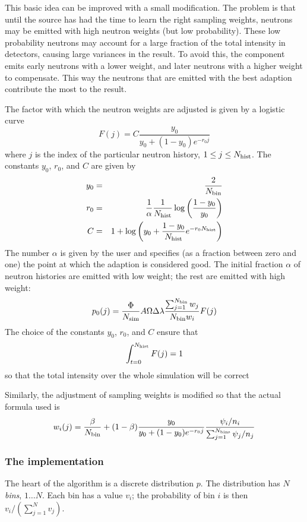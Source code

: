 This basic idea can be improved with a small modification. The problem
is that until the source has had the time to learn the right sampling
weights, neutrons may be emitted with high neutron weights (but low
probability). These low probability neutrons may account for a large fraction of
the total intensity in detectors, causing large variances in the
result. To avoid this, the component emits early neutrons with a lower
weight, and later neutrons with a higher weight to compensate. This way
the neutrons that are emitted with the best adaption contribute the most
to the result.

The factor with which the neutron weights are adjusted is given by a
logistic curve
\begin{equation}
  F(j) = C\frac{y_0}{y_0 + (1 - y_0) e^{-r_0 j}}
\end{equation}
where $j$ is the index of the particular neutron history, $1 \leq j
\leq N_{\rm hist}$. The constants $y_0$, $r_0$, and $C$ are given by
\begin{eqnarray}
  y_0 &=& \frac{2}{N_{\rm bin}} \\
  r_0 &=& \frac{1}{\alpha}\frac{1}{N_{\rm hist}}
     \log\left(\frac{1 - y_0}{y_0}\right) \\
  C &=& 1 + \log\left(y_0 + \frac{1 - y_0}{N_{\rm hist}}
     e^{-r_0 N_{\rm hist}}\right)
\end{eqnarray}
The number $\alpha$ is given by the user and specifies (as a fraction
between zero and one) the point at which the adaption is considered
good. The initial fraction $\alpha$ of neutron histories are emitted
with low weight; the rest are emitted with high weight:
$$ p_0(j) = 
    \frac{\Phi}{N_{\rm sim}} A \Omega \Delta\lambda 
    \frac{\sum_{j=1}^{N_{\rm bin}} w_j}{N_{\rm bin} w_i}
    F(j)
$$
The choice of the constants $y_0$, $r_0$, and $C$ ensure that
$$
\int_{t=0}^{N_{\rm hist}} F(j) = 1
$$
so that the total intensity over the whole simulation will be correct

Similarly, the adjustment of sampling weights is modified so that the
actual formula used is
$$
w_i(j) = \frac{\beta}{N_{\rm bin}} + 
    (1-\beta) \frac{y_0}{y_0 + (1 - y_0) e^{-r_0 j}}
     \frac{\psi_i/n_i}{\sum_{j=1}^{N_{\rm bins}} \psi_j/n_j}
$$

\subsubsection{The implementation}

The heart of the algorithm is a discrete distribution $p$. The
distribution has $N$ \emph{bins}, $1\ldots N$. Each bin has a value
$v_i$; the probability of bin $i$ is then $v_i/(\sum_{j=1}^N v_j)$.

